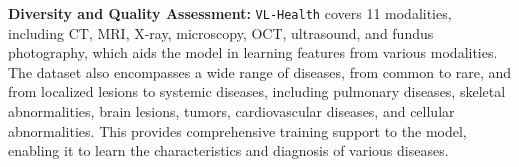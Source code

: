 \noindent \textbf{Diversity and Quality Assessment:} \texttt{VL-Health} covers 11 modalities, including CT, MRI, X-ray, microscopy, OCT, ultrasound, and fundus photography, which aids the model in learning features from various modalities. The dataset also encompasses a wide range of diseases, from common to rare, and from localized lesions to systemic diseases, including pulmonary diseases, skeletal abnormalities, brain lesions, tumors, cardiovascular diseases, and cellular abnormalities. This provides comprehensive training support to the model, enabling it to learn the characteristics and diagnosis of various diseases.

\begin{table}[h]
\centering
\caption{Data distribution of \texttt{VL-Health} in three-stage learning strategy.}
\label{table:medical_task_stages}
\end{table}




